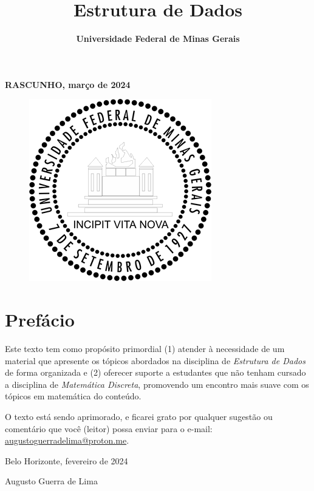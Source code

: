 \documentclass{article}
\title{\Huge\textbf{Estrutura de Dados}}
\author{}
\date{\textbf{Universidade Federal de Minas Gerais}}
\begin{document}
\maketitle
\textbf{RASCUNHO, março de 2024}
\begin{figure}
  \centering
  \includegraphics[width=0.2\linewidth]{img/UFMG.png}
\end{figure}

\newpage

\large

\section*{Prefácio}

Este texto tem como propósito primordial (1) atender à necessidade de um material que apresente os tópicos abordados na disciplina de \textit{Estrutura de Dados} de forma organizada e (2) oferecer suporte a estudantes que não tenham cursado a disciplina de \textit{Matemática Discreta}, promovendo um encontro mais suave com os tópicos em matemática do conteúdo.

O texto está sendo aprimorado, e ficarei grato por qualquer sugestão ou comentário que você (leitor) possa enviar para o e-mail: \href{mailto:augustoguerradelima@proton.me}{augustoguerradelima@proton.me}.
\vspace{0.5cm}

{\raggedleft
Belo Horizonte, fevereiro de 2024

Augusto Guerra de Lima

\smiley{}
\par}

\newpage



\tableofcontents

\newpage






\end{document}
